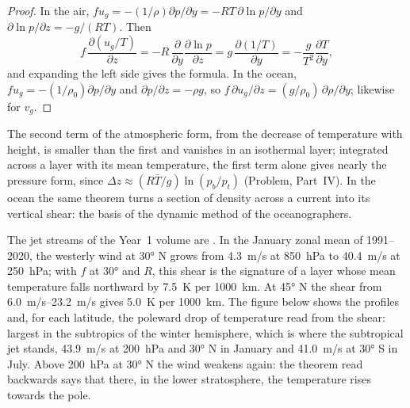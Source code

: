 \begin{proof}
In the air, $fu_g = -(1/\rho)\partial p/\partial y = -RT\,\partial\ln
p/\partial y$ and $\partial\ln p/\partial z = -g/(RT)$. Then
\[
f\,\frac{\partial(u_g/T)}{\partial z} = -R\,\frac{\partial}{\partial y}\frac{\partial\ln p}{\partial z}
= g\,\frac{\partial(1/T)}{\partial y} = -\frac{g}{T^2}\frac{\partial T}{\partial y} ,
\]
and expanding the left side gives the formula. In the ocean, $fu_g = -(1/\rho_0)\partial
p/\partial y$ and $\partial p/\partial z = -\rho g$, so $f\,\partial u_g/
\partial z = (g/\rho_0)\,\partial\rho/\partial y$; likewise for $v_g$.
\end{proof}

The second term of the atmospheric form, from the decrease of temperature
with height, is smaller than the first and vanishes in an isothermal
layer; integrated across a layer with its mean temperature, the first term
alone gives nearly the pressure form, since $\Delta z \approx (R\bar T/g)
\ln(p_b/p_t)$ (Problem, Part~IV). In the ocean the same theorem turns a
section of density across a current into its vertical shear: the basis of
the dynamic method of the oceanographers.


The jet streams of the Year~1 volume are . In the January
zonal mean of 1991--2020, the westerly wind at \ang{30} N grows from
\qty{4.3}{m/s} at \qty{850}{hPa} to \qty{40.4}{m/s} at \qty{250}{hPa}; with
$f$ at \ang{30} and $R$, this shear is the signature of a layer whose mean
temperature falls northward by \qty{7.5}{K} per \qty{1000}{km}. At \ang{45}
N the shear from \qtyrange{6.0}{23.2}{m/s} gives \qty{5.0}{K} per
\qty{1000}{km}. The figure below shows the profiles and, for each latitude,
the poleward drop of temperature read from the shear: largest in the
subtropics of the winter hemisphere, which is where the subtropical jet
stands, \qty{43.9}{m/s} at \qty{200}{hPa} and \ang{30} N in January and
\qty{41.0}{m/s} at \ang{30} S in July. Above \qty{200}{hPa} at \ang{30} N
the wind weakens again: the  theorem read backwards says that
there, in the lower stratosphere, the temperature rises towards the pole.

